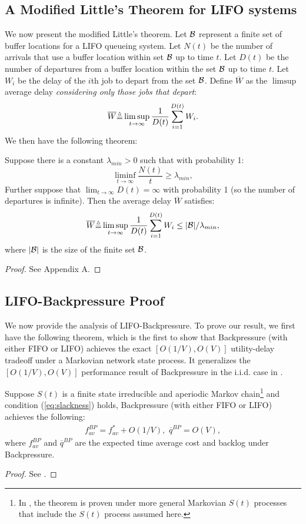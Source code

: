 \documentclass[journal]{IEEEtran}
\newcommand{\defequiv}{\mbox{\raisebox{-.3ex}{$\overset{\vartriangle}{=}$}}}
\newcommand{\script}[1]{{{\cal{#1} }}}
\begin{document}
\subsection{A Modified Little's Theorem for LIFO systems} \label{section:LIFO-little}
We now present the modified Little's theorem. 
Let $\script{B}$ represent a finite set of buffer locations for a LIFO queueing system. 
Let $N(t)$ be the number of arrivals that use a buffer
location within set $\script{B}$ up to time $t$.  Let $D(t)$ be the number of departures from a buffer location within the set 
$\script{B}$ up to time $t$.  Let $W_i$ be the delay of the $i$th job to depart from the set $\script{B}$.  Define $\overline{W}$ as the
$\limsup$ average delay \emph{considering only those jobs that depart}: 
\[ \overline{W} \defequiv \limsup_{t\rightarrow\infty} \frac{1}{D(t)}\sum_{i=1}^{D(t)} W_i. \]
We then have the following theorem: 
\begin{thm} \label{theorem:little1} 
Suppose there is a constant $\lambda_{min}>0$ such that with probability 1: 
\[ \liminf_{t\rightarrow\infty} \frac{N(t)}{t} \geq \lambda_{min}, \]
Further suppose that $\lim_{t\rightarrow\infty} D(t) = \infty$ with probability 1 (so the number of departures is infinite). 
Then the average delay $\overline{W}$ satisfies: 
\[ \overline{W} \defequiv \limsup_{t\rightarrow\infty} \frac{1}{D(t)}\sum_{i=1}^{D(t)} W_i \leq |\script{B}|/\lambda_{min}, \]
where $|\script{B}|$ is the size of the finite set $\script{B}$. 
\end{thm} 
\begin{proof}
See Appendix A. 
\end{proof}

\subsection{LIFO-Backpressure Proof}
We now provide the analysis of LIFO-Backpressure. 
To prove our result, we first have the following theorem, which is the first to show that Backpressure (with either FIFO or LIFO) achieves the exact $[O(1/V), O(V)]$ utility-delay tradeoff under a Markovian network state process. It generalizes the $[O(1/V), O(V)]$ performance result of Backpressure in the i.i.d. case in \cite{neelynowbook}. 
\begin{thm}\label{theorem:qla-markovian}
Suppose $S(t)$ is a finite state irreducible and aperiodic Markov chain\footnote{In \cite{huangneely_qlamarkovian}, the theorem is proven under more general Markovian $S(t)$ processes that include the $S(t)$ process assumed here.}  and condition (\ref{eq:slackness}) holds, Backpressure (with either FIFO or LIFO) achieves the following:
\begin{eqnarray}
f_{av}^{BP}=f^*_{av} + O(1/V), \,\, \overline{q}^{BP} = O(V), 
\end{eqnarray}
where $f_{av}^{BP}$ and $\overline{q}^{BP}$ are the expected time average cost and  backlog under Backpressure. 
\end{thm}
\begin{proof}
See \cite{huangneely_qlamarkovian}. 
\end{proof}
\end{document}
